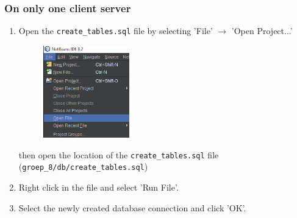 \documentclass[11pt]{article}
\begin{document}
\subsubsection{On only one client server}
\begin{enumerate}
	\item Open the \texttt{create\_tables.sql} file by selecting 'File' $\rightarrow$ 'Open Project...'
	\begin{figure}[H]
		\centering
		\includegraphics[height=40mm]{open_file.png}
	\end{figure}
	then open the location of the \texttt{create\_tables.sql} file (\texttt{groep\_8/db/create\_tables.sql})
	\item Right click in the file and select 'Run File'.
	\item Select the newly created database connection and click 'OK'.
\end{enumerate}
\end{document}
